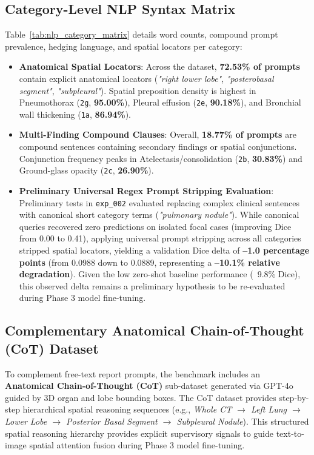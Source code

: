 \documentclass[11pt,a4paper]{article}
\begin{document}
\subsection{Category-Level NLP Syntax Matrix}
Table~\ref{tab:nlp_category_matrix} details word counts, compound prompt prevalence, hedging language, and spatial locators per category:
\begin{itemize}
    \item \textbf{Anatomical Spatial Locators}: Across the dataset, \textbf{72.53\% of prompts} contain explicit anatomical locators (\textit{"right lower lobe"}, \textit{"posterobasal segment"}, \textit{"subpleural"}). Spatial preposition density is highest in Pneumothorax (\texttt{2g}, \textbf{95.00\%}), Pleural effusion (\texttt{2e}, \textbf{90.18\%}), and Bronchial wall thickening (\texttt{1a}, \textbf{86.94\%}).
    \item \textbf{Multi-Finding Compound Clauses}: Overall, \textbf{18.77\% of prompts} are compound sentences containing secondary findings or spatial conjunctions. Conjunction frequency peaks in Atelectasis/consolidation (\texttt{2b}, \textbf{30.83\%}) and Ground-glass opacity (\texttt{2c}, \textbf{26.90\%}).
    \item \textbf{Preliminary Universal Regex Prompt Stripping Evaluation}: Preliminary tests in \texttt{exp\_002} evaluated replacing complex clinical sentences with canonical short category terms (\textit{"pulmonary nodule"}). While canonical queries recovered zero predictions on isolated focal cases (improving Dice from 0.00 to 0.41), applying universal prompt stripping across all categories stripped spatial locators, yielding a validation Dice delta of \textbf{--1.0 percentage points} (from 0.0988 down to 0.0889, representing a \textbf{--10.1\% relative degradation}). Given the low zero-shot baseline performance (~9.8\% Dice), this observed delta remains a preliminary hypothesis to be re-evaluated during Phase 3 model fine-tuning.
\end{itemize}

\subsection{Complementary Anatomical Chain-of-Thought (CoT) Dataset}
To complement free-text report prompts, the benchmark includes an \textbf{Anatomical Chain-of-Thought (CoT)} sub-dataset generated via GPT-4o guided by 3D organ and lobe bounding boxes. The CoT dataset provides step-by-step hierarchical spatial reasoning sequences (e.g., \textit{Whole CT $\rightarrow$ Left Lung $\rightarrow$ Lower Lobe $\rightarrow$ Posterior Basal Segment $\rightarrow$ Subpleural Nodule}). This structured spatial reasoning hierarchy provides explicit supervisory signals to guide text-to-image spatial attention fusion during Phase 3 model fine-tuning.
\end{document}
